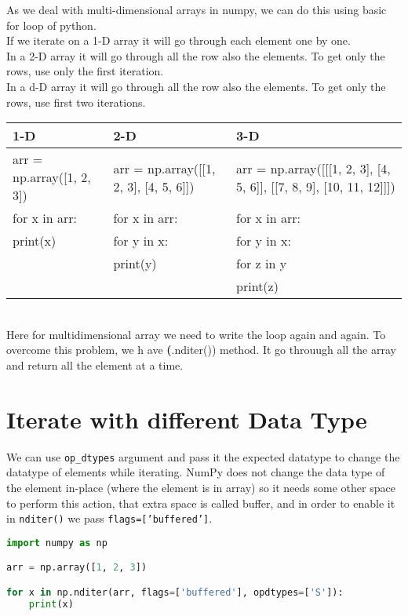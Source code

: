 \documentclass[openany]{book}
\begin{document}
As we deal with multi-dimensional arrays in numpy, we can do this using basic for loop of python. \\

If we iterate on a 1-D array it will go through each element one by one.\\

In a 2-D array it will go through all the row also the elements. To get only the rows, use only the first iteration. \\

In a d-D array it will go through all the row also the elements. To get only the rows, use  first two iterations.


\begin{tabular}{|p{4cm}|p{6cm}|p{8.5cm}|}
    \hline
    1-D & 2-D & 3-D \\
    \hline
arr = np.array([1, 2, 3]) &  arr = np.array([[1, 2, 3], [4, 5, 6]]) &     arr = np.array([[[1, 2, 3], [4, 5, 6]], [[7, 8, 9], [10, 11, 12]]]) \\
for x in arr: & for x in arr: & for x in arr:\\
print(x) & for y in x: & for y in x: \\
& print(y) & for z in y \\
& & print(z) \\
\hline
\end{tabular}\\


Here for multidimensional array we need to write the loop again and again. To overcome this problem, we h ave \textbf(.nditer()) method. It go throuugh all the array and return all the element at a time. \\

\section{Iterate with different Data Type}
We can use \texttt{op\_dtypes} argument and pass it the expected datatype to change the datatype of elements while iterating.
NumPy does not change the data type of the element in-place (where the element is in array) so it needs some other space to perform this action, that extra space is called buffer, and in order to enable it in \texttt{nditer()} we pass \texttt{flags=['buffered']}.

\begin{lstlisting}[language=Python]
import numpy as np

arr = np.array([1, 2, 3])

for x in np.nditer(arr, flags=['buffered'], opdtypes=['S']):
    print(x)
\end{lstlisting}
\end{document}
